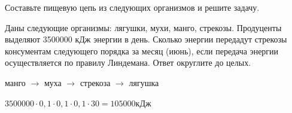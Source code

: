 
Составьте пищевую цепь из следующих организмов и решите задачу.

Даны следующие организмы: лягушки, мухи, манго, стрекозы. Продуценты выделяют 3500000 кДж энергии в день. 
Сколько энергии передадут стрекозы консументам следующего порядка за месяц (июнь), 
если передача энергии осуществляется по правилу Линдемана. Ответ округлите до целых.

\solutionSection

манго $\rightarrow$ муха $\rightarrow$ стрекоза $\rightarrow$ лягушка

$3500000 \cdot 0,1 \cdot 0,1  \cdot 0,1 \cdot 30 = 105000$кДж


